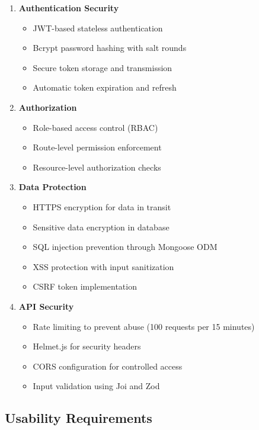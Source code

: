 \documentclass[12pt,a4paper]{report}
\begin{document}
\begin{enumerate}[leftmargin=*]
    \item \textbf{Authentication Security}
    \begin{itemize}
        \item JWT-based stateless authentication
        \item Bcrypt password hashing with salt rounds
        \item Secure token storage and transmission
        \item Automatic token expiration and refresh
    \end{itemize}
    
    \item \textbf{Authorization}
    \begin{itemize}
        \item Role-based access control (RBAC)
        \item Route-level permission enforcement
        \item Resource-level authorization checks
    \end{itemize}
    
    \item \textbf{Data Protection}
    \begin{itemize}
        \item HTTPS encryption for data in transit
        \item Sensitive data encryption in database
        \item SQL injection prevention through Mongoose ODM
        \item XSS protection with input sanitization
        \item CSRF token implementation
    \end{itemize}
    
    \item \textbf{API Security}
    \begin{itemize}
        \item Rate limiting to prevent abuse (100 requests per 15 minutes)
        \item Helmet.js for security headers
        \item CORS configuration for controlled access
        \item Input validation using Joi and Zod
    \end{itemize}
\end{enumerate}

\subsection{Usability Requirements}
\end{document}
